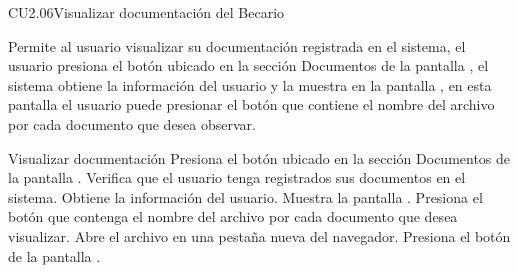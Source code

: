 \begin{UseCase}{CU2.06}{Visualizar documentación del Becario}{
    Permite al usuario  visualizar su documentación registrada en el sistema, el usuario presiona el botón   ubicado en la sección  Documentos  de la pantalla , el sistema obtiene la información del usuario y la muestra en la pantalla , en esta pantalla el usuario puede presionar el botón que contiene el nombre del archivo  por cada documento que desea observar.
       
    \bigskip
}
		
\end{UseCase}
	
	\begin{UCtrayectoria}{Visualizar documentación }
		\UCpaso[\UCactor]Presiona el botón  ubicado en la sección Documentos de la pantalla .
		\UCpaso[\UCsist] Verifica que el usuario tenga registrados sus documentos en el sistema.
		\UCpaso[\UCsist] Obtiene la información del usuario.
		\UCpaso[\UCsist] Muestra la pantalla .
		\UCpaso[\UCactor]Presiona el botón que contenga el nombre del archivo  por cada documento que desea visualizar.
		\UCpaso[\UCsist] Abre el archivo en una pestaña nueva del navegador.
        \UCpaso[\UCactor]Presiona el botón  de la pantalla .
		
	\end{UCtrayectoria}
	

